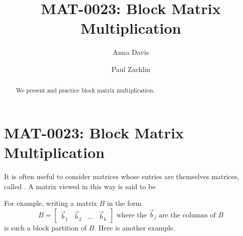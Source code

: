 \documentclass{ximera}
\author{Anna Davis \and Paul Zachlin} \title{MAT-0023: Block Matrix Multiplication} \license{CC-BY-NC-SA}
\begin{document}
\begin{abstract}
We present and practice block matrix multiplication. 
\end{abstract}
\maketitle

\section*{MAT-0023: Block Matrix Multiplication}
\begin{definition}\label{def:blockmat}
It is often useful to consider matrices whose entries are themselves matrices, called . A matrix viewed in this way is said to be 
\end{definition}

For example, writing a matrix $B$ in the form
\begin{equation*}
B = \begin{bmatrix}
\vec{b}_{1} & \vec{b}_{2} & \ldots & \vec{b}_{k}
\end{bmatrix} \mbox{ where the } \vec{b}_{j} \mbox{ are the columns of } B
\end{equation*}
is such a block partition of $B$. Here is another example.
\end{document}
